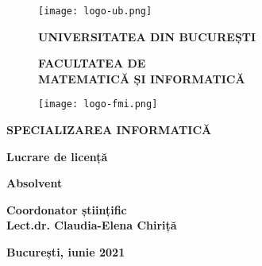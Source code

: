 \begin{titlepage}

    
    \begin{figure}[!htb]
        \centering
        \begin{minipage}{0.2\textwidth}
            \texttt{[image: logo-ub.png]}
        \end{minipage}
        \begin{minipage}{0.5\textwidth}
            \large
            \vspace{0.2cm}
            \begin{center}
                \textbf{UNIVERSITATEA DIN BUCUREȘTI}
            \end{center}
            \vspace{0.3cm}
            \begin{center}
                \textbf{
                    FACULTATEA DE \\
                    MATEMATICĂ ȘI INFORMATICĂ
                }
            \end{center}
        \end{minipage}
        \begin{minipage}{0.2\textwidth}
            \texttt{[image: logo-fmi.png]}
        \end{minipage}
    \end{figure}
    
    \begin{center}
    \textbf{SPECIALIZAREA INFORMATICĂ}
    \end{center}
    
    \vspace{0.5cm}
    
    \begin{center}
    \Large \textbf{Lucrare de licență}
    \end{center}
    
    \begin{center}
    \huge \textbf{\MakeUppercase{\@title}}
    \end{center}
    
    \vspace{1cm}
    
    \begin{center}
    \large \textbf{Absolvent \\ \@author}
    \end{center}
    
    \vspace{0.25cm}
    
    \begin{center}
    \large \textbf{Coordonator științific \\ Lect.dr. Claudia-Elena Chiriță}
    \end{center}
    
    \vspace{2cm}
    
    \begin{center}
    \Large \textbf{București, iunie 2021}
    \end{center}
    \end{titlepage}
